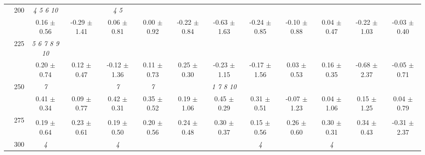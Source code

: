 \begin{table}[h]
{\begin{tabular}{
        ccccccccccccc}
 & \multirow{2}{*}{200}& \textit{  4  5  6 10 }& & \textit{ 4 5 }& & & & & & & &  \\ 
 & & 0.16 $\pm$ 0.56& -0.29 $\pm$ 1.41& 0.06 $\pm$ 0.81& 0.00 $\pm$ 0.92& -0.22 $\pm$ 0.84& -0.63 $\pm$ 1.63& -0.24 $\pm$ 0.85& -0.10 $\pm$ 0.88& 0.04 $\pm$ 0.47& -0.22 $\pm$ 1.03& -0.03 $\pm$ 0.40 \\ 
 & \multirow{2}{*}{225}& \cellcolor[HTML]{EFEFEF} \textit{  5  6  7  8  9 10 }& \cellcolor[HTML]{EFEFEF} & \cellcolor[HTML]{EFEFEF} & \cellcolor[HTML]{EFEFEF} & \cellcolor[HTML]{EFEFEF} & \cellcolor[HTML]{EFEFEF} & \cellcolor[HTML]{EFEFEF} & \cellcolor[HTML]{EFEFEF} & \cellcolor[HTML]{EFEFEF} & \cellcolor[HTML]{EFEFEF} & \cellcolor[HTML]{EFEFEF}  \\ 
 & & \cellcolor[HTML]{EFEFEF} 0.20 $\pm$ 0.74& \cellcolor[HTML]{EFEFEF} 0.12 $\pm$ 0.47& \cellcolor[HTML]{EFEFEF} -0.12 $\pm$ 1.36& \cellcolor[HTML]{EFEFEF} 0.11 $\pm$ 0.73& \cellcolor[HTML]{EFEFEF} 0.25 $\pm$ 0.30& \cellcolor[HTML]{EFEFEF} -0.23 $\pm$ 1.15& \cellcolor[HTML]{EFEFEF} -0.17 $\pm$ 1.56& \cellcolor[HTML]{EFEFEF} 0.03 $\pm$ 0.53& \cellcolor[HTML]{EFEFEF} 0.16 $\pm$ 0.35& \cellcolor[HTML]{EFEFEF} -0.68 $\pm$ 2.37& \cellcolor[HTML]{EFEFEF} -0.05 $\pm$ 0.71 \\ 
 & \multirow{2}{*}{250}& \textit{ 7 }& & \textit{ 7 }& \textit{ 7 }& & \textit{  1  7  8 10 }& & & & &  \\ 
 & & 0.41 $\pm$ 0.34& 0.09 $\pm$ 0.77& 0.42 $\pm$ 0.31& 0.35 $\pm$ 0.52& 0.19 $\pm$ 1.06& 0.45 $\pm$ 0.29& 0.31 $\pm$ 0.51& -0.07 $\pm$ 1.23& 0.04 $\pm$ 1.06& 0.15 $\pm$ 1.25& 0.04 $\pm$ 0.79 \\ 
 & \multirow{2}{*}{275}& \cellcolor[HTML]{EFEFEF} & \cellcolor[HTML]{EFEFEF} & \cellcolor[HTML]{EFEFEF} & \cellcolor[HTML]{EFEFEF} & \cellcolor[HTML]{EFEFEF} & \cellcolor[HTML]{EFEFEF} & \cellcolor[HTML]{EFEFEF} & \cellcolor[HTML]{EFEFEF} & \cellcolor[HTML]{EFEFEF} & \cellcolor[HTML]{EFEFEF} & \cellcolor[HTML]{EFEFEF}  \\ 
 & & \cellcolor[HTML]{EFEFEF} 0.19 $\pm$ 0.64& \cellcolor[HTML]{EFEFEF} 0.23 $\pm$ 0.61& \cellcolor[HTML]{EFEFEF} 0.19 $\pm$ 0.50& \cellcolor[HTML]{EFEFEF} 0.20 $\pm$ 0.56& \cellcolor[HTML]{EFEFEF} 0.24 $\pm$ 0.48& \cellcolor[HTML]{EFEFEF} 0.30 $\pm$ 0.37& \cellcolor[HTML]{EFEFEF} 0.15 $\pm$ 0.56& \cellcolor[HTML]{EFEFEF} 0.26 $\pm$ 0.60& \cellcolor[HTML]{EFEFEF} 0.30 $\pm$ 0.31& \cellcolor[HTML]{EFEFEF} 0.34 $\pm$ 0.43& \cellcolor[HTML]{EFEFEF} -0.31 $\pm$ 2.37 \\ 
 & \multirow{2}{*}{300}& \textit{ 4 }& & \textit{ 4 }& & & & \textit{ 4 }& & \textit{ 4 }& &  \\ 

\end{tabular}}
\end{table}
